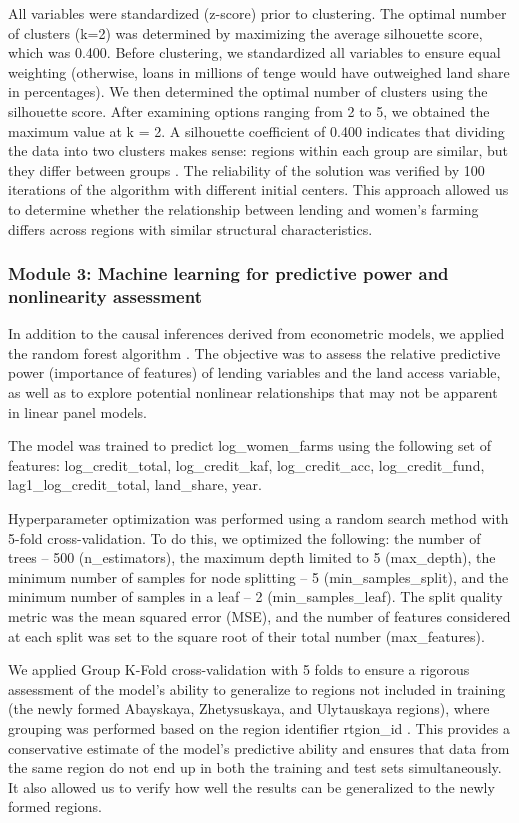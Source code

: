 ﻿\documentclass[pdflatex,sn-mathphys-ay]{sn-jnl}
\begin{document}
All variables were standardized (z-score) prior to clustering. The
optimal number of clusters (k=2) was determined by maximizing the
average silhouette score, which was 0.400. Before clustering, we
standardized all variables to ensure equal weighting (otherwise, loans
in millions of tenge would have outweighed land share in percentages).
We then determined the optimal number of clusters using the silhouette
score. After examining options ranging from 2 to 5, we obtained the
maximum value at k = 2. A silhouette coefficient of 0.400 indicates that
dividing the data into two clusters makes sense: regions within each
group are similar, but they differ between groups \citep{ref45}. The reliability of the solution was verified by 100 iterations
of the algorithm with different initial centers. This approach allowed
us to determine whether the relationship between lending and women's
farming differs across regions with similar structural characteristics.

\subsubsection{Module 3: Machine learning for predictive power and nonlinearity assessment}

In addition to the causal inferences derived from econometric models, we
applied the random forest algorithm \citep{ref83}. The
objective was to assess the relative predictive power (importance of
features) of lending variables and the land access variable, as well as
to explore potential nonlinear relationships that may not be apparent in
linear panel models.

The model was trained to predict log\_women\_farms using the following
set of features: log\_credit\_total, log\_credit\_kaf, log\_credit\_acc,
log\_credit\_fund, lag1\_log\_credit\_total, land\_share, year.

Hyperparameter optimization was performed using a random search method
with 5-fold cross-validation. To do this, we optimized the following:
the number of trees -- 500 (n\_estimators), the maximum depth limited to
5 (max\_depth), the minimum number of samples for node splitting -- 5
(min\_samples\_split), and the minimum number of samples in a leaf -- 2
(min\_samples\_leaf). The split quality metric was the mean squared
error (MSE), and the number of features considered at each split was set
to the square root of their total number (max\_features).

We applied Group K-Fold cross-validation with 5 folds to ensure a
rigorous assessment of the model's ability to generalize to regions not
included in training (the newly formed Abayskaya, Zhetysuskaya, and
Ulytauskaya regions), where grouping was performed based on the region
identifier rtgion\_id \citep{ref65}. This provides a
conservative estimate of the model's predictive ability and ensures that
data from the same region do not end up in both the training and test
sets simultaneously. It also allowed us to verify how well the results
can be generalized to the newly formed regions.
\end{document}
